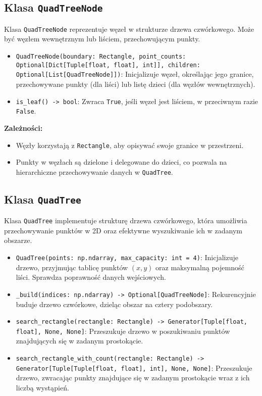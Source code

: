 \documentclass[12pt]{article}
\begin{document}
\subsection{Klasa \texttt{QuadTreeNode}}
Klasa \texttt{QuadTreeNode} reprezentuje węzeł w strukturze drzewa czwórkowego. Może być węzłem wewnętrznym lub liściem, przechowującym punkty.

\begin{itemize}
    \item \texttt{QuadTreeNode(boundary: Rectangle, point\_counts: Optional[Dict[Tuple[float, float], int]], children: Optional[List[QuadTreeNode]])}: 
    Inicjalizuje węzeł, określając jego granice, przechowywane punkty (dla liści) lub listę dzieci (dla węzłów wewnętrznych).
    \item \texttt{is\_leaf() -> bool}: 
    Zwraca \texttt{True}, jeśli węzeł jest liściem, w przeciwnym razie \texttt{False}.
\end{itemize}

\textbf{Zależności:}
\begin{itemize}
    \item Węzły korzystają z \texttt{Rectangle}, aby opisywać swoje granice w przestrzeni.
    \item Punkty w węzłach są dzielone i delegowane do dzieci, co pozwala na hierarchiczne przechowywanie danych w \texttt{QuadTree}.
\end{itemize}

\subsection{Klasa \texttt{QuadTree}}
Klasa \texttt{QuadTree} implementuje strukturę drzewa czwórkowego, która umożliwia przechowywanie punktów w 2D oraz efektywne wyszukiwanie ich w zadanym obszarze.

\begin{itemize}
    \item \texttt{QuadTree(points: np.ndarray, max\_capacity: int = 4)}: 
    Inicjalizuje drzewo, przyjmując tablicę punktów \( (x, y) \) oraz maksymalną pojemność liści. Sprawdza poprawność danych wejściowych.
    \item \texttt{\_build(indices: np.ndarray) -> Optional[QuadTreeNode]}: 
    Rekurencyjnie buduje drzewo czwórkowe, dzieląc obszar na cztery podobszary.
    \item \texttt{search\_rectangle(rectangle: Rectangle) -> Generator[Tuple[float, float], None, None]}: 
    Przeszukuje drzewo w poszukiwaniu punktów znajdujących się w zadanym prostokącie.
    \item \texttt{search\_rectangle\_with\_count(rectangle: Rectangle) -> Generator[Tuple[Tuple[float, float], int], None, None]}: 
    Przeszukuje drzewo, zwracając punkty znajdujące się w zadanym prostokącie wraz z ich liczbą wystąpień.
\end{itemize}
\end{document}
